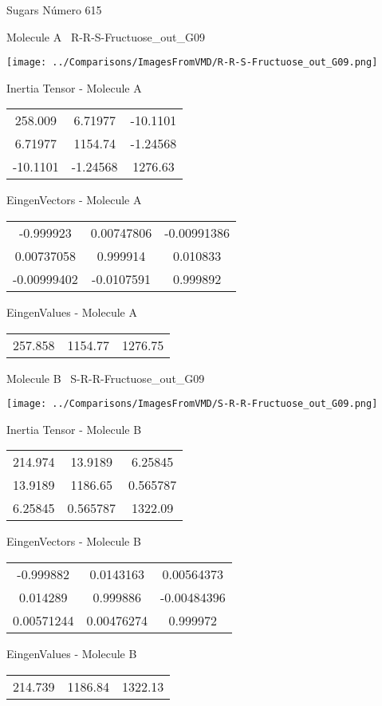 \vtab[-3cm]
\begin{center}
{\large Sugars \tab Número 615}
\end{center}
\begin{multicols}{2}
\begin{center}

Molecule A \
R-R-S-Fructuose\_out\_G09

\texttt{[image: ../Comparisons/ImagesFromVMD/R-R-S-Fructuose\_out\_G09.png]}

Inertia Tensor - Molecule A \\
\begin{tabular}{|c c c|}
258.009	 & 	6.71977	 & 	-10.1101	 \\
6.71977	 & 	1154.74	 & 	-1.24568	 \\
-10.1101	 & 	-1.24568	 & 	1276.63
\end{tabular}

\vtab
 EingenVectors - Molecule A     \\
\begin{tabular}{|c c c|}
-0.999923	 & 	0.00747806	 & 	-0.00991386	 \\
0.00737058	 & 	0.999914	 & 	0.010833	 \\
-0.00999402	 & 	-0.0107591	 & 	0.999892
\end{tabular}

\vtab
 EingenValues - Molecule A     \\
\begin{tabular}{|c c c|}
257.858	 & 	1154.77	 & 	1276.75	 \\
\end{tabular}
\columnbreak

Molecule B \
S-R-R-Fructuose\_out\_G09

\texttt{[image: ../Comparisons/ImagesFromVMD/S-R-R-Fructuose\_out\_G09.png]}

Inertia Tensor - Molecule B \\
\begin{tabular}{|c c c|}
214.974	 & 	13.9189	 & 	6.25845	 \\
13.9189	 & 	1186.65	 & 	0.565787	 \\
6.25845	 & 	0.565787	 & 	1322.09
\end{tabular}

\vtab
 EingenVectors - Molecule B     \\
\begin{tabular}{|c c c|}
-0.999882	 & 	0.0143163	 & 	0.00564373	 \\
0.014289	 & 	0.999886	 & 	-0.00484396	 \\
0.00571244	 & 	0.00476274	 & 	0.999972
\end{tabular}

\vtab
 EingenValues - Molecule B     \\
\begin{tabular}{|c c c|}
214.739	 & 	1186.84	 & 	1322.13	 \\
\end{tabular}

\end{center}
\end{multicols}

